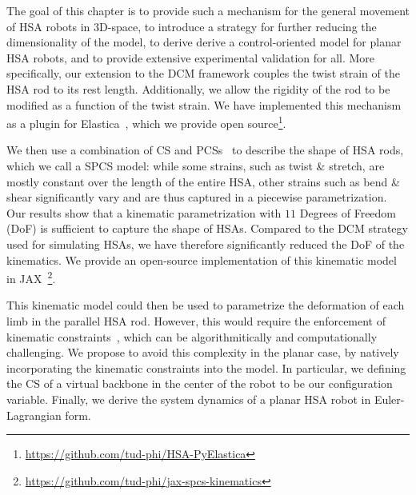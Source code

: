 The goal of this chapter is to provide such a mechanism for the general movement of \gls{HSA} robots in 3D-space, to introduce a strategy for further reducing the dimensionality of the model, to derive derive a control-oriented model for planar \gls{HSA} robots, and to provide extensive experimental validation for all. 
More specifically, our extension to the \gls{DCM} framework couples the twist strain of the \gls{HSA} rod to its rest length. %
Additionally, we allow the rigidity of the rod to be modified as a function of the twist strain. %
We have implemented this mechanism as a plugin for Elastica~\cite{naughton2021elastica}, which we provide open source\footnote{\url{https://github.com/tud-phi/HSA-PyElastica}}. 

We then use a combination of \gls{CS} and \glspl{PCS}~\cite{renda2018discrete} to describe the shape of \gls{HSA} rods, which we call a \gls{SPCS} model: while some strains, such as twist \& stretch, are mostly constant over the length of the entire \gls{HSA}, other strains such as bend \& shear significantly vary and are thus captured in a piecewise parametrization. 
Our results show that a kinematic parametrization with $11$ Degrees of Freedom (DoF) is sufficient to capture the shape of \glspl{HSA}.
Compared to the \gls{DCM} strategy used for simulating \glspl{HSA}, we have therefore significantly reduced the DoF of the kinematics.
We provide an open-source implementation of this kinematic model in JAX~\footnote{\scriptsize \url{https://github.com/tud-phi/jax-spcs-kinematics}}.

This kinematic model could then be used to parametrize the deformation of each limb in the parallel \gls{HSA} rod.
However, this would require the enforcement of kinematic constraints~\cite {armanini2021discrete}, which can be algorithmitically and computationally challenging.
We propose to avoid this complexity in the planar case, by natively incorporating the kinematic constraints into the model. In particular, we 
defining the \gls{CS} of a virtual backbone in the center of the robot to be our configuration variable.
Finally, we derive the system dynamics of a planar \gls{HSA} robot in Euler-Lagrangian form.

